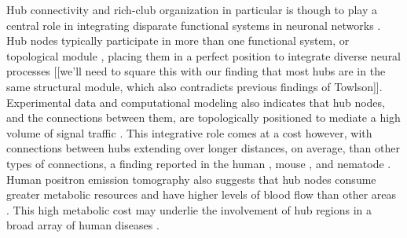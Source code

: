 \documentclass[10pt,letterpaper]{article}
\begin{document}
Hub connectivity and rich-club organization in particular is though to play a central role in integrating disparate functional systems in neuronal networks \cite{Fornito:2015dq, VandenHeuvel2013a, ZamoraLopez:2010hy, Crossley2014, Crossley:2013kl}.
Hub nodes typically participate in more than one functional system, or topological module \cite{deReus:2013cy, deReus:2014cz, ZamoraLopez:2010hy}, placing them in a perfect position to integrate diverse neural processes [[we'll need to square this with our finding that most hubs are in the same structural module, which also contradicts previous findings of Towlson]].
Experimental data and computational modeling also indicates that hub nodes, and the connections between them, are topologically positioned to mediate a high volume of signal traffic \cite{vandenHeuvel:2012kh, Harriger:2012bb, Misic:2014it, Misic:2015jw}.
This integrative role comes at a cost however, with connections between hubs extending over longer distances, on average, than other types of connections, a finding reported in the human \cite{vandenHeuvel:2012kh}, mouse \cite{Fulcher:2016ck}, and nematode \cite{Towlson:2013gf}.
Human positron emission tomography also suggests that hub nodes consume greater metabolic resources and have higher levels of blood flow than other areas \cite{Tomasi:2013kl, Collin:2014kq, Liang2013a}.
This high metabolic cost may underlie the involvement of hub regions in a broad array of human diseases \cite{Fornito2015, Bullmore:2012vl, Crossley:2014eta}.
\end{document}
